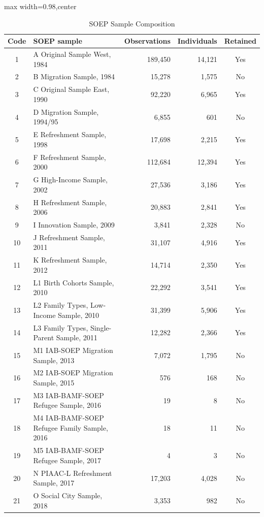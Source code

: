\begin{table}[!htbp]
\centering
\caption{SOEP Sample Composition}
\label{tab:appendix_soep_sample_composition}
\begingroup
\scriptsize
\setlength{\tabcolsep}{6pt}
\renewcommand{\arraystretch}{1.08}
\begin{adjustbox}{max width=0.98\textwidth,center}
\begin{tabular}{clrrc}
\toprule
Code & SOEP sample & Observations & Individuals & Retained \\
\midrule
1 & A Original Sample West, 1984 & 189,450 & 14,121 & Yes \\
2 & B Migration Sample, 1984 & 15,278 & 1,575 & No \\
3 & C Original Sample East, 1990 & 92,220 & 6,965 & Yes \\
4 & D Migration Sample, 1994/95 & 6,855 & 601 & No \\
5 & E Refreshment Sample, 1998 & 17,698 & 2,215 & Yes \\
6 & F Refreshment Sample, 2000 & 112,684 & 12,394 & Yes \\
7 & G High-Income Sample, 2002 & 27,536 & 3,186 & Yes \\
8 & H Refreshment Sample, 2006 & 20,883 & 2,841 & Yes \\
9 & I Innovation Sample, 2009 & 3,841 & 2,328 & No \\
10 & J Refreshment Sample, 2011 & 31,107 & 4,916 & Yes \\
11 & K Refreshment Sample, 2012 & 14,714 & 2,350 & Yes \\
12 & L1 Birth Cohorts Sample, 2010 & 22,292 & 3,541 & Yes \\
13 & L2 Family Types, Low-Income Sample, 2010 & 31,399 & 5,906 & Yes \\
14 & L3 Family Types, Single-Parent Sample, 2011 & 12,282 & 2,366 & Yes \\
15 & M1 IAB-SOEP Migration Sample, 2013 & 7,072 & 1,795 & No \\
16 & M2 IAB-SOEP Migration Sample, 2015 & 576 & 168 & No \\
17 & M3 IAB-BAMF-SOEP Refugee Sample, 2016 & 19 & 8 & No \\
18 & M4 IAB-BAMF-SOEP Refugee Family Sample, 2016 & 18 & 11 & No \\
19 & M5 IAB-BAMF-SOEP Refugee Sample, 2017 & 4 & 3 & No \\
20 & N PIAAC-L Refreshment Sample, 2017 & 17,203 & 4,028 & No \\
21 & O Social City Sample, 2018 & 3,353 & 982 & No \\

\end{tabular}
\end{adjustbox}
\end{table}
